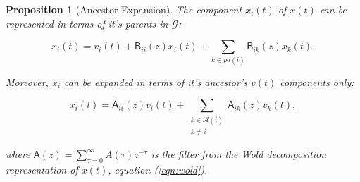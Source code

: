 \documentclass{statsoc}
\def\gcg{\mathcal{G}}  %
\def\B{\mathsf{B}}  %
\def\A{\mathsf{A}}  %
\newcommand{\pa}[1]{pa(#1)}  %
\newcommand{\anc}[1]{\mathcal{A}(#1)}  %
\newtheorem{proposition}{Proposition}
\begin{document}
\begin{proposition}[Ancestor Expansion]
  \label{prop:parent_expanding}
  The component $x_i(t)$ of $x(t)$ can be represented in terms of it's
  parents in $\gcg$:

  \begin{equation}
    \label{eqn:parent_expansion}
    x_i(t) = v_i(t) + \B_{ii}(z)x_i(t) + \sum_{k \in \pa{i}}\B_{ik}(z)x_k(t).
  \end{equation}

  Moreover, $x_i$ can be expanded in terms of it's ancestor's $v(t)$
  components only:

  \begin{equation}
    \label{eqn:ancestor_expansion}
    x_i(t) = \A_{ii}(z)v_i(t) + \sum_{\substack{k \in \anc{i} \\ k \ne i}}\A_{ik}(z)v_k(t),
  \end{equation}

  where $\A(z) = \sum_{\tau = 0}^\infty A(\tau)z^{-\tau}$ is the filter from
  the Wold decomposition representation of $x(t)$, equation
  (\ref{eqn:wold}).
\end{proposition}
\end{document}

